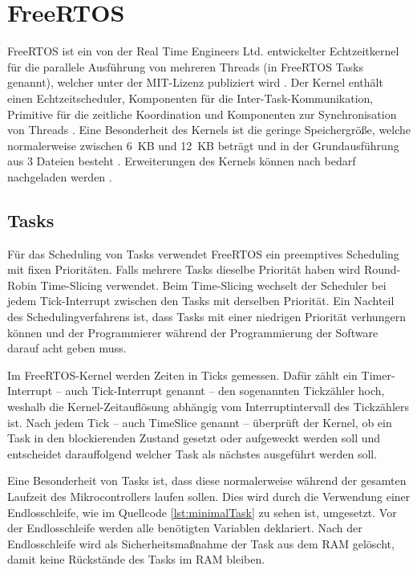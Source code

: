\section{FreeRTOS}
FreeRTOS ist ein von der Real Time Engineers Ltd. entwickelter Echtzeitkernel für die parallele Ausführung von mehreren Threads (in FreeRTOS Tasks genannt), welcher unter der MIT-Lizenz publiziert wird \cites[S.~2]{barryFreeRTOS}{freeRTOSAbout}{freeRTOSLicense}. Der Kernel enthält einen Echtzeitscheduler, Komponenten für die Inter-Task-Kommunikation, Primitive für die zeitliche Koordination und Komponenten zur Synchronisation von Threads \cite{freeRTOSAbout}. Eine Besonderheit des Kernels ist die geringe Speichergröße, welche normalerweise zwischen 6~KB und 12~KB beträgt und in der Grundausführung aus 3 Dateien besteht \cites{freeRTOSKernel}{freeRTOSSource}. Erweiterungen des Kernels können nach bedarf nachgeladen werden \cite{freeRTOSSource}.

\subsection{Tasks}
Für das Scheduling von Tasks verwendet FreeRTOS ein preemptives Scheduling mit fixen Prioritäten. Falls mehrere Tasks dieselbe Priorität haben wird Round-Robin Time-Slicing verwendet. Beim Time-Slicing wechselt der Scheduler bei jedem Tick-Interrupt zwischen den Tasks mit derselben Priorität. Ein Nachteil des Schedulingverfahrens ist, dass Tasks mit einer niedrigen Priorität verhungern können und der Programmierer während der Programmierung der Software darauf acht geben muss. \cites{freeRTOSFAQScheduling}{freeRTOSScheduling}

Im FreeRTOS-Kernel werden Zeiten in Ticks gemessen. Dafür zählt ein Timer-Interrupt -- auch Tick-Interrupt genannt -- den sogenannten Tickzähler hoch, weshalb die Kernel-Zeitauflösung abhängig vom Interruptintervall des Tickzählers ist. Nach jedem Tick -- auch TimeSlice genannt -- überprüft der Kernel, ob ein Task in den blockierenden Zustand gesetzt oder aufgeweckt werden soll und entscheidet darauffolgend welcher Task als nächstes ausgeführt werden soll. \cites[S.~61]{barryFreeRTOS}{freeRTOSTick}

Eine Besonderheit von Tasks ist, dass diese normalerweise während der gesamten Laufzeit des Mikrocontrollers laufen sollen. Dies wird durch die Verwendung einer Endlosschleife, wie im Quellcode \ref{lst:minimalTask} zu sehen ist, umgesetzt. Vor der Endlosschleife werden alle benötigten Variablen deklariert. Nach der Endlosschleife wird als Sicherheitsmaßnahme der Task aus dem \acs{RAM} gelöscht, damit keine Rückstände des Tasks im \acs{RAM} bleiben. \cite[S.~46]{barryFreeRTOS}

